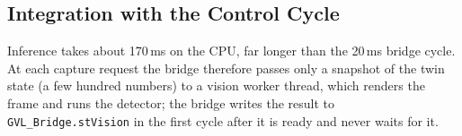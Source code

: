\subsection{Integration with the Control Cycle}

Inference takes about 170\,ms on the CPU, far longer than the 20\,ms bridge cycle. At each
capture request the bridge therefore passes only a snapshot of the twin state (a few hundred
numbers) to a vision worker thread, which renders the frame and runs the detector; the bridge
writes the result to \texttt{GVL\_Bridge.stVision} in the first cycle after it is ready and never
waits for it.
